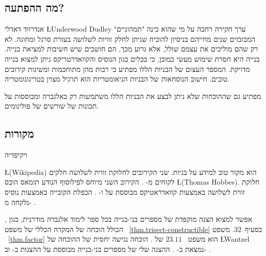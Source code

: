 \subsection*{מה ההפתעה?}
אנדרווד דאדלי
\L{Underwood Dudley}
ערך חקירה רחבה על מי שהוא כינה "תמהוניים" המבזבזים שנים מחייהם בניסיון להוכיח שניתן לחלק זוויות לשלושה בעזרת סרגל ומחוגה. לא רק שהם מוליכים את עצמם שולל, אלא גרוע מכך, הם חושבים שיש חשיבות למציאת בנייה. בנייה היא חסרת שימוש מעשי כמובן, כי בכלים כגון הנוסיס והקוואדרטריקס ניתן למצוא בנייה מדויקת. המספר העצום של הבניות הללו מפתיע כי רבות מהן מתוחכמות ומשיגות קירובים טובים. חישוב הנוסחאות של הבניות הגיאומטריות הוא תרגיל מצוין בטריגונומטריה.

מפתיע גם שההוכחות שלא ניתן לבצע את הבניות הללו משתמשות רק באלגברה ומבוססות על תכונות של שורשים של פולינומים.


\subsection*{מקורות}
ויקיפדיה

\L{(Wikipedia)} \cite{wiki:tri, wiki:neu, wiki:quad}
הוא מקור טוב למידע על בניות. שני הקירובים לחלוקת זווית לשלושה חלקים לקוחים מ-%
\cite[עמודים
67-68, 95-96]{dudley-budget}.
הקירוב השני מיוחס לפילוסוף הנודע תומאס הובס
\L{(Thomas Hobbes)}.
חלוקת זווית לשלושה באמצעות קוואדראטיקס מבוססת על
\cite[עמודים~48-49]{martin}
ו-%
\cite[עמודים 6-7]{dudley-budget}.
הכפלת הקובייה באמצעות נוסיס נלקחה מ-%
 \cite{dorrie2}.

אפשר למצוא הצגה מוקפדת של מספרים בני-בנייה בכל ספר לימוד אלגברה מודרנית, כגון
\cite{fraleigh},
הכולל הוכחה של המקרה הכללי של משפט%
~\ref{thm.trisect-constructible}
בסעיף~$32$. משפט%
~\ref{thm.factor}
הוא משפט%
~$23.11$
של
\cite{fraleigh}.
הוכחה נגישה יחסית של ההוכחה של 
\L{Wantzel}
נמצאת ב-%
\cite{suzuki}.
ההצגה שלי של מספרים בני-בנייה מבוססת על ההצגות ב-%
\cite[פרק~\L{III}]{courant}
וב-%
\cite{laugwitz}.
